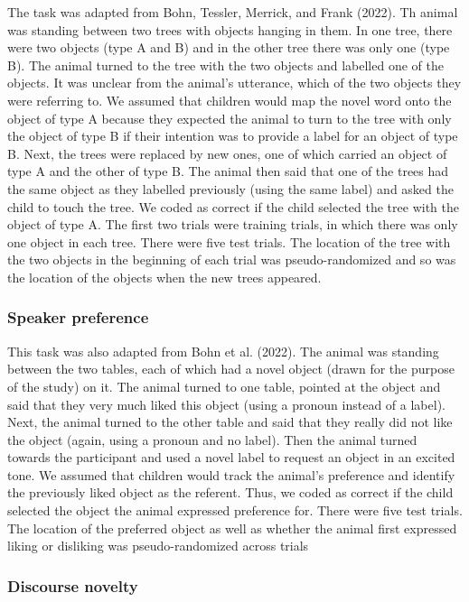 \documentclass[
  man,floatsintext]{apa6}
\begin{document}
The task was adapted from Bohn, Tessler, Merrick, and Frank (2022). Th animal was standing between two trees with objects hanging in them. In one tree, there were two objects (type A and B) and in the other tree there was only one (type B). The animal turned to the tree with the two objects and labelled one of the objects. It was unclear from the animal's utterance, which of the two objects they were referring to. We assumed that children would map the novel word onto the object of type A because they expected the animal to turn to the tree with only the object of type B if their intention was to provide a label for an object of type B. Next, the trees were replaced by new ones, one of which carried an object of type A and the other of type B. The animal then said that one of the trees had the same object as they labelled previously (using the same label) and asked the child to touch the tree. We coded as correct if the child selected the tree with the object of type A. The first two trials were training trials, in which there was only one object in each tree. There were five test trials. The location of the tree with the two objects in the beginning of each trial was pseudo-randomized and so was the location of the objects when the new trees appeared.

\hypertarget{speaker-preference}{%
\subsubsection{Speaker preference}\label{speaker-preference}}

This task was also adapted from Bohn et al. (2022). The animal was standing between the two tables, each of which had a novel object (drawn for the purpose of the study) on it. The animal turned to one table, pointed at the object and said that they very much liked this object (using a pronoun instead of a label). Next, the animal turned to the other table and said that they really did not like the object (again, using a pronoun and no label). Then the animal turned towards the participant and used a novel label to request an object in an excited tone. We assumed that children would track the animal's preference and identify the previously liked object as the referent. Thus, we coded as correct if the child selected the object the animal expressed preference for. There were five test trials. The location of the preferred object as well as whether the animal first expressed liking or disliking was pseudo-randomized across trials

\hypertarget{discourse-novelty}{%
\subsubsection{Discourse novelty}\label{discourse-novelty}}
\end{document}
